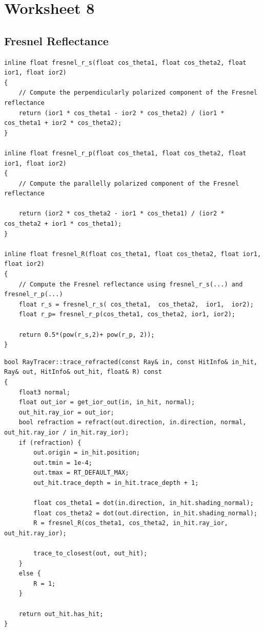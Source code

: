 \section{Worksheet 8}
\subsection{Fresnel Reflectance}

\begin{lstlisting}
inline float fresnel_r_s(float cos_theta1, float cos_theta2, float ior1, float ior2)
{
	// Compute the perpendicularly polarized component of the Fresnel reflectance
	return (ior1 * cos_theta1 - ior2 * cos_theta2) / (ior1 * cos_theta1 + ior2 * cos_theta2);
}

inline float fresnel_r_p(float cos_theta1, float cos_theta2, float ior1, float ior2)
{
	// Compute the parallelly polarized component of the Fresnel reflectance
	
	return (ior2 * cos_theta2 - ior1 * cos_theta1) / (ior2 * cos_theta2 + ior1 * cos_theta1);
}

inline float fresnel_R(float cos_theta1, float cos_theta2, float ior1, float ior2)
{
	// Compute the Fresnel reflectance using fresnel_r_s(...) and fresnel_r_p(...)
	float r_s = fresnel_r_s( cos_theta1,  cos_theta2,  ior1,  ior2);
	float r_p= fresnel_r_p(cos_theta1, cos_theta2, ior1, ior2);
	
	return 0.5*(pow(r_s,2)+ pow(r_p, 2));
}
\end{lstlisting}

\begin{lstlisting}
bool RayTracer::trace_refracted(const Ray& in, const HitInfo& in_hit, Ray& out, HitInfo& out_hit, float& R) const
{
	float3 normal;
	float out_ior = get_ior_out(in, in_hit, normal);
	out_hit.ray_ior = out_ior;
	bool refraction = refract(out.direction, in.direction, normal, out_hit.ray_ior / in_hit.ray_ior);
	if (refraction) {
		out.origin = in_hit.position;
		out.tmin = 1e-4;
		out.tmax = RT_DEFAULT_MAX;
		out_hit.trace_depth = in_hit.trace_depth + 1;
		
		float cos_theta1 = dot(in.direction, in_hit.shading_normal);
		float cos_theta2 = dot(out.direction, in_hit.shading_normal);
		R = fresnel_R(cos_theta1, cos_theta2, in_hit.ray_ior, out_hit.ray_ior);
		
		trace_to_closest(out, out_hit);
	}
	else {
		R = 1;
	}
	
	return out_hit.has_hit;
}
\end{lstlisting}

